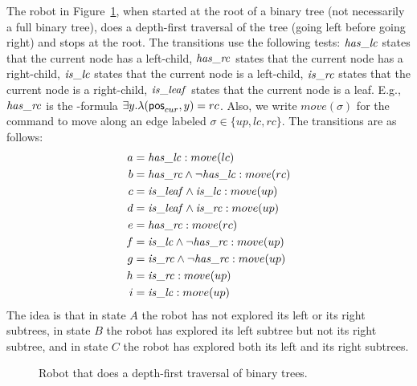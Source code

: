 \begin{example}
The robot in Figure~\ref{fig:dfs}, when started at the root of a binary tree (not necessarily a full binary tree), does a depth-first traversal of the tree (going left before going right) and stops at the root. The transitions use the following tests: $\mathit{has\_lc}$ states that the current node has a left-child, $\mathit{has\_rc}$ states that the current node has a right-child, $\mathit{is\_lc}$ states that the current node is a left-child, $\mathit{is\_rc}$ states that the current node is a right-child, $\mathit{is\_leaf}$ states that the current node is a leaf. E.g., $\mathit{has\_rc}$ is the \msol-formula  $\exists y. \lambda(\mathsf{pos}_{cur},y) = rc$. Also, we write $move(\sigma)$ for the command to move along an edge labeled $\sigma \in \{up,lc,rc\}$. The transitions are as follows:
\begin{align*}
a &= \mathit{has\_lc}:move(lc)\\
b &= \mathit{has\_rc} \wedge \neg \mathit{has\_lc}:move(rc)\\
c &= \mathit{is\_leaf} \wedge \mathit{is\_lc}:move(up)\\
d &= \mathit{is\_leaf} \wedge \mathit{is\_rc}:move(up)\\
e &= \mathit{has\_rc}:move(rc)\\
f &= \mathit{is\_lc} \wedge \neg \mathit{has\_rc}:move(up)\\
g &= \mathit{is\_rc} \wedge \neg \mathit{has\_rc}:move(up)\\
h &= \mathit{is\_rc}:move(up)\\
i &= \mathit{is\_lc}:move(up)
\end{align*}
The idea is that in state $A$ the robot has not explored its left or its right subtrees, in state $B$ the robot has explored its left subtree but not its right subtree, and in state $C$ the robot has explored both its left and its right subtrees.
\end{example}


\begin{figure}[htbp]
\centering

\caption{Robot that does a depth-first traversal of binary trees.}
\label{fig:dfs}
%    
%
%    
\end{figure}


